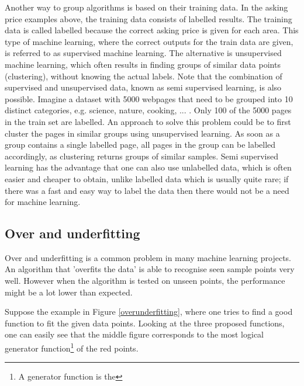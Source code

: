 \npar

Another way to group algorithms is based on their training data\citep{prml}. In the asking price examples above, the training data consists of labelled results. The training data is called labelled because the correct asking price is given for each area. This type of machine learning, where the correct outputs for the train data are given, is referred to as supervised machine learning\citep{prml}. The alternative is unsupervised machine learning\citep{prml}, which often results in finding groups of similar data points (clustering), without knowing the actual labels. Note that the combination of supervised and unsupervised data, known as semi supervised learning, is also possible\citep{semiSup}. Imagine a dataset with 5000 webpages that need to be grouped into 10 distinct categories, e.g. science, nature, cooking, ... . Only 100 of the 5000 pages in the train set are labelled. An approach to solve this problem could be to first cluster the pages in similar groups using unsupervised learning. As soon as a group contains a single labelled page, all pages in the group can be labelled accordingly, as clustering returns groups of similar samples. Semi supervised learning has the advantage that one can also use unlabelled data, which is often easier and cheaper to obtain, unlike labelled data which is usually quite rare; if there was a fast and easy way to label the data then there would not be a need for machine learning.

\subsection{Over and underfitting}

Over and underfitting is a common problem in many machine learning projects\citep{prml}. An algorithm that 'overfits the data' is able to recognise seen sample points very well. However when the algorithm is tested on unseen points, the performance might be a lot lower than expected.


Suppose the example in Figure \ref{overunderfitting}, where one tries to find a good function to fit the given data points. Looking at the three proposed functions, one can easily see that the middle figure corresponds to the most logical generator function\footnote{A generator function is the } of the red points. 

